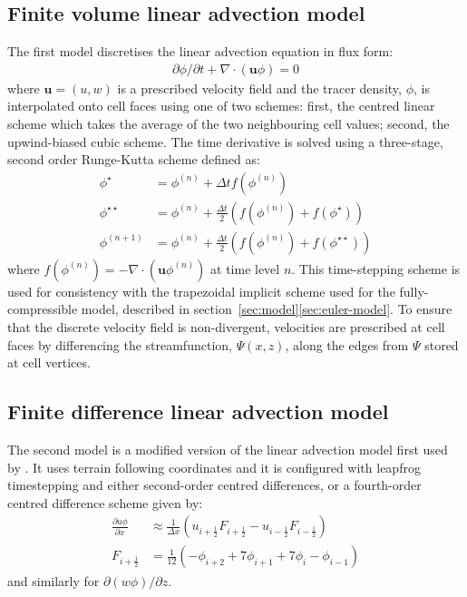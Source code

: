 \documentclass{ametsoc}
\begin{document}
\subsection{Finite volume linear advection model}
The first model discretises the linear advection equation in flux form:
\begin{align}
\partial \phi / \partial t + \nabla \cdot \left( \mathbf{u} \phi \right) = 0
\label{eq:advect}
\end{align}
where $\mathbf{u} = (u, w)$ is a prescribed velocity field and the tracer density, $\phi$, is interpolated onto cell faces using one of two schemes: first, the centred linear scheme which takes the average of the two neighbouring cell values; second, the upwind-biased cubic scheme.
The time derivative is solved using a three-stage, second order Runge-Kutta scheme defined as:
\begin{subequations}
\begin{align}
	\phi^\star &= \phi^{(n)} + \Delta t f(\phi^{(n)}) \\
	\phi^{\star\star} &= \phi^{(n)} + \frac{\Delta t}{2} \left( f(\phi^{(n)}) + f(\phi^\star) \right) \\
	\phi^{(n+1)} &= \phi^{(n)} + \frac{\Delta t}{2} \left( f(\phi^{(n)}) + f(\phi^{\star\star}) \right)
\end{align}
\end{subequations}
where \(f(\phi^{(n)}) = - \nabla \cdot (\mathbf{u} \phi^{(n)})\) at time level \(n\).  This time-stepping scheme is used for consistency with the trapezoidal implicit scheme used for the fully-compressible model, described in section~\ref{sec:model}\ref{sec:euler-model}.
To ensure that the discrete velocity field is non-divergent, velocities are prescribed at cell faces by differencing the streamfunction, \(\Psi(x, z)\), along the edges from \(\Psi\) stored at cell vertices.

\subsection{Finite difference linear advection model}
The second model is a modified version of the linear advection model first used by \citet{schaer2002}.  It uses terrain following coordinates and it is configured with leapfrog timestepping and either second-order centred differences, or a fourth-order centred difference scheme given by:
\begin{subequations}
\begin{align}
	\frac{\partial u \phi}{\partial x} &\approx \frac{1}{\Delta x} \left( u_{i+\frac{1}{2}} F_{i+\frac{1}{2}} - u_{i - \frac{1}{2}} F_{i - \frac{1}{2}}\right) \\
	F_{i+\frac{1}{2}} &= \frac{1}{12} \left( - \phi_{i+2} + 7 \phi_{i+1} + 7 \phi_i - \phi_{i-1} \right)
\end{align}
\end{subequations}
and similarly for \(\partial (w \phi) / \partial z\).
\end{document}
